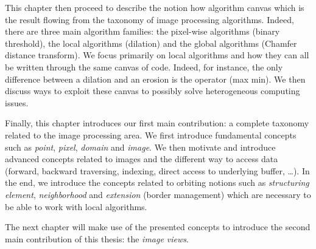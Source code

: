 This chapter then proceed to describe the notion how algorithm canvas which is the result flowing from the taxonomy of
image processing algorithms. Indeed, there are three main algorithm families: the pixel-wise algorithms (binary
threshold), the local algorithms (dilation) and the global algorithms (Chamfer distance transform). We focus primarily
on local algorithms and how they can all be written through the same canvas of code. Indeed, for instance, the only
difference between a dilation and an erosion is the operator (max \vs min). We then discuss ways to exploit these canvas
to possibly solve heterogeneous computing issues.

Finally, this chapter introduces our first main contribution: a complete taxonomy related to the image processing area.
We first introduce fundamental concepts such as \emph{point}, \emph{pixel}, \emph{domain} and \emph{image}. We then
motivate and introduce advanced concepts related to images and the different way to access data (forward, backward
traversing, indexing, direct access to underlying buffer, \ldots). In the end, we introduce the concepts related to
orbiting notions such as \emph{structuring element}, \emph{neighborhood} and \emph{extension} (border management) which
are necessary to be able to work with local algorithms.

The next chapter will make use of the presented concepts to introduce the second main contribution of this thesis: the
\emph{image views}.

